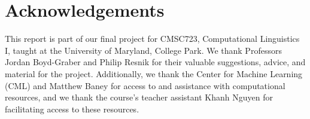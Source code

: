 \section{Acknowledgements}
This report is part of our final project for CMSC723, Computational Linguistics I, taught at the University of Maryland, College Park. We thank Professors Jordan Boyd-Graber and Philip Resnik for their valuable suggestions, advice, and material for the project. Additionally, we thank the Center for Machine Learning (CML) and Matthew Baney for access to and assistance with computational resources, and we thank the course's teacher assistant Khanh Nguyen for facilitating access to these resources.